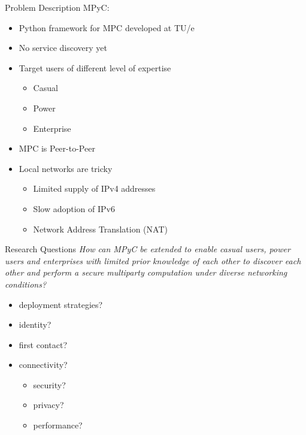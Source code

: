 \begin{frame}{Problem Description}
\protect\hypertarget{problem-description}{}
MPyC:

\begin{itemize}
\tightlist
\item
  Python framework for MPC developed at TU/e
\item
  No service discovery yet
\item
  Target users of different level of expertise

  \begin{itemize}
  \tightlist
  \item
    Casual
  \item
    Power
  \item
    Enterprise
  \end{itemize}
\item
  MPC is Peer-to-Peer
\item
  Local networks are tricky

  \begin{itemize}
  \tightlist
  \item
    Limited supply of IPv4 addresses
  \item
    Slow adoption of IPv6
  \item
    Network Address Translation (NAT)
  \end{itemize}
\end{itemize}
\end{frame}

\begin{frame}{Research Questions}
\protect\hypertarget{research-questions}{}
\emph{How can MPyC be extended to enable casual users, power users and
enterprises with limited prior knowledge of each other to discover each
other and perform a secure multiparty computation under diverse
networking conditions?}

\begin{itemize}
\tightlist
\item
  deployment strategies?
\item
  identity?
\item
  first contact?
\item
  connectivity?

  \begin{itemize}
  \tightlist
  \item
    security?
  \item
    privacy?
  \item
    performance?
  \end{itemize}
\end{itemize}
\end{frame}

